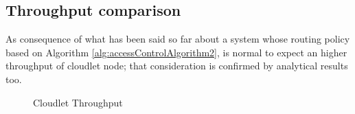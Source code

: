 \documentclass[10pt,a4paper]{article}
\begin{document}
\subsection{Throughput comparison}

As consequence of what has been said so far about a system whose routing policy based on Algorithm \ref{alg:accessControlAlgorithm2}, is normal to expect an higher throughput
of cloudlet node; that consideration is confirmed by analytical results too.

\begin{figure}[h!]
    \centering
    \caption{Cloudlet Throughput}%
    \label{fig:CloudletThroughput}
\end{figure}
\end{document}

